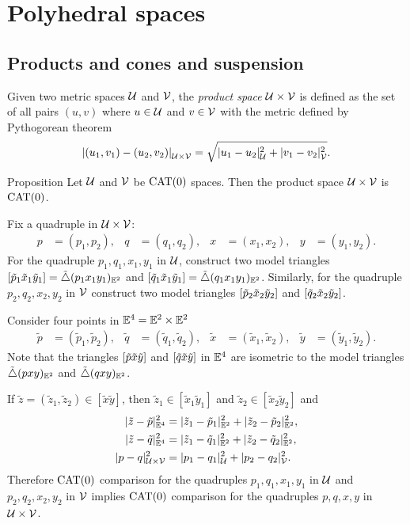 \chapter{Polyhedral spaces}\label{chap:poly}

\section{Products and cones and suspension}
\label{sec:Products and cones}

Given two metric spaces $\mathcal{U}$ and $\mathcal{V}$, the \emph{product space} 
$\mathcal{U}\times\mathcal{V}$ is defined as the set of all pairs $(u,v)$ where $u\in\mathcal{U}$ and $v\in \mathcal{V}$ 
with the metric defined by Pythogorean theorem
\[\dist{(u_1,v_1)}{(u_2,v_2)}{\spc{U}\times\spc{V}}=\sqrt{\dist[2]{u_1}{u_2}{\spc{U}}+\dist[2]{v_1}{v_2}{\spc{V}}}.\]

\begin{thm}{Proposition}\label{ex:product-CAT}
Let $\mathcal{U}$ and $\mathcal{V}$ be $\mathrm{CAT}(0)$ spaces.
Then the product space $\mathcal{U}\times\mathcal{V}$ is $\mathrm{CAT}(0)$.
\end{thm}

Fix a quadruple in $\mathcal{U}\times \mathcal{V}$:
\begin{align*}
p&=(p_1,p_2),
&
q&=(q_1,q_2), 
&
x&=(x_1,x_2),
&
y&=(y_1,y_2).
\end{align*}
For the quadruple $p_1,q_1,x_1,y_1$ in $\mathcal{U}$,
construct two model triangles $[\tilde p_1\tilde x_1\tilde y_1]=\tilde\triangle(p_1x_1y_1)_{\mathbb{E}^2}$ 
and $[\tilde q_1\tilde x_1\tilde y_1]=\tilde\triangle(q_1x_1y_1)_{\mathbb{E}^2}$.  
Similarly, for the quadruple $p_2,q_2,x_2,y_2$ in $\mathcal{V}$
construct two model triangles $[\tilde p_2\tilde x_2\tilde y_2]$ and $[\tilde q_2\tilde x_2\tilde y_2]$.

Consider four points in $\mathbb{E}^4=\mathbb{E}^2\times\mathbb{E}^2$ 
\begin{align*}
\tilde p&=(\tilde p_1,\tilde p_2),
&
\tilde q&=(\tilde q_1,\tilde q_2),
&
\tilde x&=(\tilde x_1,\tilde x_2),
&
\tilde y&=(\tilde y_1,\tilde y_2).
\end{align*}
Note that the triangles $[\tilde p\tilde x\tilde y]$ and $[\tilde q\tilde x\tilde y]$ in $\mathbb{E}^4$ are isometric to the model triangles 
$\tilde\triangle(pxy)_{\mathbb{E}^2}$ and $\tilde\triangle(qxy)_{\mathbb{E}^2}$.

If $\tilde z=(\tilde z_1,\tilde z_2)\in [\tilde x\tilde y]$, then $\tilde z_1\in [\tilde x_1\tilde y_1]$ and $\tilde z_2\in [\tilde x_2\tilde y_2]$ and
\begin{align*}
\dist[2]{\tilde z}{\tilde p}{\EE^4}&=\dist[2]{\tilde z_1}{\tilde p_1}{\EE^2}+\dist[2]{\tilde z_2}{\tilde p_2}{\EE^2},
\\
\dist[2]{\tilde z}{\tilde q}{\EE^4}&=\dist[2]{\tilde z_1}{\tilde q_1}{\EE^2}+\dist[2]{\tilde z_2}{\tilde q_2}{\EE^2},
\\
\dist[2]{p}{q}{\spc{U}\times\spc{V}}&=\dist[2]{p_1}{q_1}{\spc{U}}+\dist[2]{p_2}{q_2}{\spc{V}}.
\end{align*}
Therefore $\mathrm{CAT}(0)$ comparison for the quadruples $p_1,q_1,x_1,y_1$ in $\mathcal{U}$
and 
$p_2,q_2,x_2,y_2$ in $\mathcal{V}$ implies 
$\mathrm{CAT}(0)$ comparison for the quadruples $p,q,x,y$ in $\mathcal{U}\times \mathcal{V}$.
\qeds

